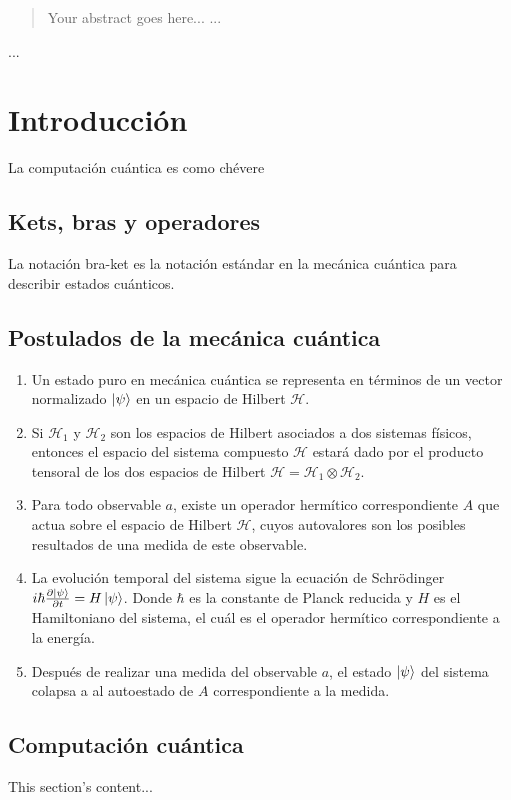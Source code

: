 \documentclass[11pt, spanish]{report}
\begin{document}
\begin{abstract}
Your abstract goes here...
...
\end{abstract}
...

\chapter{Introducción}
La computación cuántica es como chévere

\section{Kets, bras y operadores}

La notación bra-ket es la notación estándar en la mecánica cuántica para
describir estados cuánticos.

\section{Postulados de la mecánica cuántica}
\begin{enumerate}
\item Un estado puro en mecánica cuántica se representa en términos de
  un vector normalizado $\ket{\psi}$ en un espacio de Hilbert
  $\mathcal{H}$.
\item Si $\mathcal{H}_1$ y $\mathcal{H}_2$ son los espacios de Hilbert asociados a dos sistemas físicos, entonces el espacio del sistema
  compuesto $\mathcal{H}$ estará dado por el producto tensoral de los
  dos espacios de Hilbert
  $\mathcal{H} = \mathcal{H}_1 \otimes \mathcal{H}_2$.
\item Para todo observable $a$, existe un operador hermítico
  correspondiente $A$ que actua sobre el espacio de Hilbert
  $\mathcal{H}$, cuyos autovalores son los posibles resultados de una
  medida de este observable.
\item La evolución temporal del sistema sigue la ecuación de
  Schrödinger
  $i \hbar \frac{\partial \ket{\psi}}{\partial t} = H
  \ket{\psi}$. Donde $\hbar$ es la constante de Planck reducida y $H$
  es el Hamiltoniano del sistema, el cuál es el operador hermítico
  correspondiente a la energía.
\item Después de realizar una medida del observable $a$, el estado
  $\ket{\psi}$ del sistema colapsa a al autoestado de $A$
  correspondiente a la medida.
\end{enumerate}

\section{Computación cuántica}
This section's content...
\end{document}
